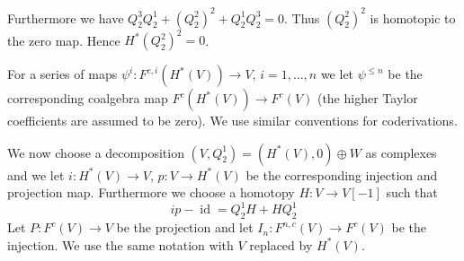 \documentclass{amsart}
\numberwithin{equation}{section}
\theoremstyle{definition}
\theoremstyle{remark}
\begin{document}
Furthermore we have $Q^3_2Q^1_2+(Q^2_2)^2+Q^1_2Q^3_2=0$. Thus $(Q^2_2)^2$
is homotopic to the zero map. Hence $H^\ast(Q_2^2)^2=0$.

For a series of maps $\psi^i:F^{c,i}(H^\ast(V))\rightarrow V$, $i=1,\ldots,n$
we let $\psi^{\le n}$ be the corresponding coalgebra map
$F^c(H^\ast(V))\rightarrow F^c(V)$ (the higher Taylor coefficients are assumed
to be zero). We use similar conventions for coderivations. 

We now choose a decomposition $(V,Q^1_2)=(H^\ast(V),0)\oplus W$ as complexes
and we let $i:H^\ast(V)\rightarrow V$, $p:V\rightarrow H^\ast(V)$ be the corresponding
injection and projection map. Furthermore we choose a homotopy
$H:V\rightarrow V[-1]$ such that 
\[
ip-{\operatorname{id}}=Q^1_2H+HQ^1_2
\]
Let $P:F^{c}(V)\rightarrow V$ be the projection and let $I_n:F^{n,c}(V){\rightarrow}
F^c(V)$ be the injection. We use the same notation with $V$ replaced
by $H^\ast(V)$. 
\end{document}
